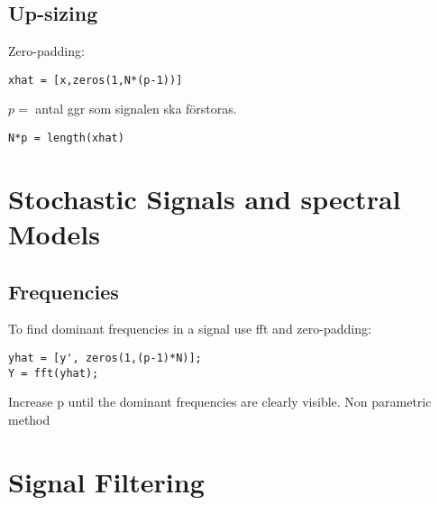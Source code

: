 \documentclass[10pt,a4paper]{report}
\begin{document}
\subsection*{Up-sizing}
Zero-padding:
\begin{verbatim}
xhat = [x,zeros(1,N*(p-1))]
\end{verbatim}
$p =$ antal ggr som signalen ska förstoras.
\begin{verbatim}
N*p = length(xhat)
\end{verbatim}
\section*{Stochastic Signals and spectral Models}
\subsection*{Frequencies}
To find dominant frequencies in a signal use fft and zero-padding:
\begin{verbatim}
yhat = [y', zeros(1,(p-1)*N)];
Y = fft(yhat);
\end{verbatim}
Increase p until the dominant frequencies are clearly visible. Non parametric method

\section*{Signal Filtering}
\end{document}
